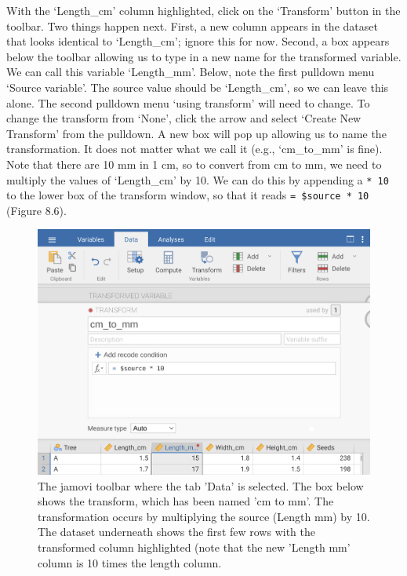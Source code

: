 \documentclass[
  openany]{scrbook}
\begin{document}
With the `Length\_cm' column highlighted, click on the `Transform' button in the toolbar.
Two things happen next.
First, a new column appears in the dataset that looks identical to `Length\_cm'; ignore this for now.
Second, a box appears below the toolbar allowing us to type in a new name for the transformed variable.
We can call this variable `Length\_mm'.
Below, note the first pulldown menu `Source variable'.
The source value should be `Length\_cm', so we can leave this alone.
The second pulldown menu `using transform' will need to change.
To change the transform from `None', click the arrow and select `Create New Transform' from the pulldown.
A new box will pop up allowing us to name the transformation.
It does not matter what we call it (e.g., `cm\_to\_mm' is fine).
Note that there are 10 mm in 1 cm, so to convert from cm to mm, we need to multiply the values of `Length\_cm' by 10.
We can do this by appending a \texttt{*\ 10} to the lower box of the transform window, so that it reads \texttt{=\ \$source\ *\ 10} (Figure 8.6).

\begin{figure}
\includegraphics[width=1\linewidth]{img/jamovi_transform_cm_to_mm} \caption{The jamovi toolbar where the tab 'Data' is selected. The box below shows the transform, which has been named 'cm to mm'. The transformation occurs by multiplying the source (Length mm) by 10. The dataset underneath shows the first few rows with the transformed column highlighted (note that the new 'Length mm' column is 10 times the length column.}\label{fig:unnamed-chunk-30}
\end{figure}
\end{document}
